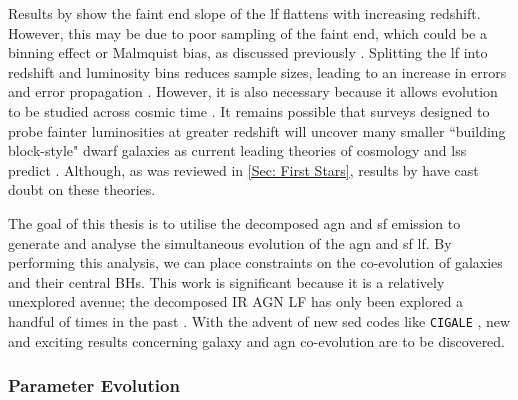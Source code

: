 Results by \cite{han_evolution_2012} show the faint end slope of the \gls{lf} flattens with increasing redshift. However, this may be due to poor sampling of the faint end, which could be a binning effect or Malmquist bias, as discussed previously \citep{madau_cosmic_2014}. Splitting the \gls{lf} into redshift and luminosity bins reduces sample sizes, leading to an increase in errors and error propagation \citep{dai_mid-infrared_2009}. However, it is also necessary because it allows evolution to be studied across cosmic time \citep{wu_mid-infrared_2011, wylezalek_galaxy_2014}. It remains possible that surveys designed to probe fainter luminosities at greater redshift will uncover many smaller ``building block-style" dwarf galaxies as current leading theories of cosmology and \gls{lss} predict \citep{magorrian_demography_1998, ziparo_primordial_2024}. Although, as was reviewed in \cref{Sec: First Stars}, results by \cite{labbe_population_2023} have cast doubt on these theories.

The goal of this thesis is to utilise the decomposed \gls{agn} and \gls{sf} emission to generate and analyse the simultaneous evolution of the \gls{agn} and \gls{sf} \gls{lf}. By performing this analysis, we can place constraints on the co-evolution of galaxies and their central BHs. This work is significant because it is a relatively unexplored avenue; the decomposed IR AGN LF has only been explored a handful of times in the past \citep{valiante_backward_2009, fu_decomposing_2010, gruppioni_modelling_2011}. With the advent of new \gls{sed} codes like \texttt{CIGALE} \citep{boquien_cigale_2019}, new and exciting results concerning galaxy and \gls{agn} co-evolution are to be discovered.

\subsubsection{Parameter Evolution}

